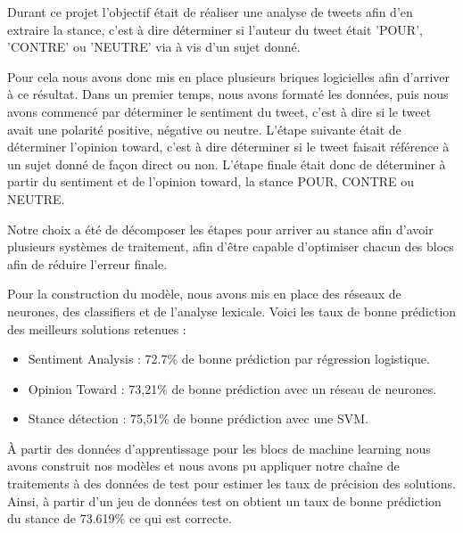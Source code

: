 \par Durant ce projet l'objectif était de réaliser une analyse de tweets afin d'en extraire la stance, c'est à dire déterminer si l'auteur du tweet était 'POUR', 'CONTRE' ou 'NEUTRE' via à vis d'un sujet donné. \\

\par Pour cela nous avons donc mis en place plusieurs briques logicielles afin d'arriver à ce résultat. Dans un premier temps, nous avons formaté les données, puis nous avons commencé par déterminer le sentiment du tweet, c'est à dire si le tweet avait une polarité positive, négative ou neutre. L'étape suivante était de déterminer l'opinion toward, c'est à dire déterminer si le tweet faisait référence à un sujet donné de façon direct ou non. L'étape finale était donc de déterminer à partir du sentiment et de l'opinion toward, la stance POUR, CONTRE ou NEUTRE. \\

\par Notre choix a été de décomposer les étapes pour arriver au stance afin d'avoir plusieurs systèmes de traitement, afin d'être capable d'optimiser chacun des blocs afin de réduire l'erreur finale.  \\

\par Pour la construction du modèle, nous avons mis en place des réseaux de neurones, des classifiers et de l'analyse lexicale. Voici les taux de bonne prédiction des meilleurs solutions retenues : \\
\begin{itemize}
	\item Sentiment Analysis : 72.7\% de bonne prédiction par régression logistique.
	\item Opinion Toward : 73,21\%  de bonne prédiction avec un réseau de neurones.
	\item Stance détection : 75,51\% de bonne prédiction avec une SVM.
\end{itemize}

\par À partir des données d'apprentissage pour les blocs de machine learning nous avons construit nos modèles et nous avons pu appliquer notre chaîne de traitements à des données de test pour estimer les taux de précision des solutions. Ainsi, à partir d'un jeu de données test on obtient un taux de bonne prédiction du stance de 73.619\% ce qui est correcte. \\

